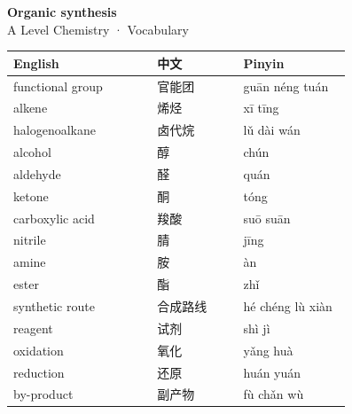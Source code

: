 \documentclass[11pt]{article}
\begin{document}
\begin{center}
  {\LARGE\bfseries Organic synthesis}\\[0.35em]
  {\large A Level Chemistry · Vocabulary}
\end{center}
\vspace{0.6em}

\begin{longtable}{@{}p{0.40\linewidth}p{0.24\linewidth}p{0.30\linewidth}@{}}
\toprule
\textbf{English} & \textbf{中文} & \textbf{Pinyin} \\
\midrule
\endhead
\bottomrule
\endlastfoot
functional group & 官能团 & guān néng tuán \\
alkene & 烯烃 & xī tīng \\
halogenoalkane & 卤代烷 & lǔ dài wán \\
alcohol & 醇 & chún \\
aldehyde & 醛 & quán \\
ketone & 酮 & tóng \\
carboxylic acid & 羧酸 & suō suān \\
nitrile & 腈 & jīng \\
amine & 胺 & àn \\
ester & 酯 & zhǐ \\
synthetic route & 合成路线 & hé chéng lù xiàn \\
reagent & 试剂 & shì jì \\
oxidation & 氧化 & yǎng huà \\
reduction & 还原 & huán yuán \\
by-product & 副产物 & fù chǎn wù \\
\end{longtable}
\end{document}
